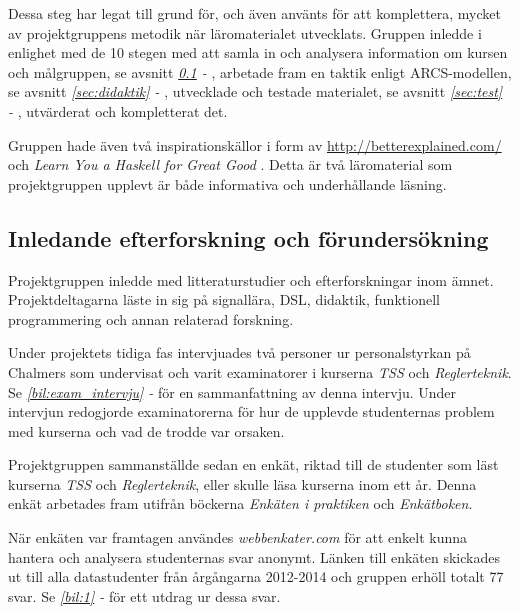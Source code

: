\documentclass[12pt,a4paper,twoside,openright]{article}
\begin{document}
Dessa steg har legat till grund för, och även använts för att
komplettera, mycket av projektgruppens metodik när läromaterialet
utvecklats. Gruppen inledde i enlighet med de 10 stegen med att samla
in och analysera information om kursen och målgruppen, se avsnitt
\textit{\ref{sec:efterforskning} - },
arbetade fram en taktik enligt ARCS-modellen, se avsnitt \textit{\ref{sec:didaktik}
- }, utvecklade och testade materialet, se avsnitt \textit{\ref{sec:test}
- }, utvärderat och kompletterat det.

Gruppen hade även två inspirationskällor i form av
\url{http://betterexplained.com/} och \textit{Learn You a Haskell for Great Good} \cite{learnyouahaskell}.
Detta är två läromaterial som projektgruppen upplevt är både
informativa och underhållande läsning.

\subsection{Inledande efterforskning och förundersökning}
\label{sec:efterforskning}

Projektgruppen inledde med litteraturstudier och efterforskningar inom
ämnet. Projektdeltagarna läste in sig på signallära, DSL, didaktik,
funktionell programmering och annan relaterad forskning.

Under projektets tidiga fas intervjuades två personer ur
personalstyrkan på Chalmers som undervisat och varit examinatorer i
kurserna \textit{TSS} och \textit{Reglerteknik}.
Se \textit{\ref{bil:exam_intervju} - } för en sammanfattning av denna
intervju. Under intervjun redogjorde examinatorerna för hur de
upplevde studenternas problem med kurserna och vad de trodde var
orsaken.

Projektgruppen sammanställde sedan en enkät, riktad till de studenter
som läst kurserna \textit{TSS} och \textit{Reglerteknik}, eller skulle
läsa kurserna inom ett år. Denna enkät arbetades fram utifrån böckerna
\textit{Enkäten i praktiken}\cite{enkaten_i_praktiken} och \textit{Enkätboken}\cite{enkatboken}.

När enkäten var framtagen användes \textit{webbenkater.com} för att
enkelt kunna hantera och analysera studenternas svar anonymt.
Länken till enkäten skickades ut till alla
datastudenter från årgångarna 2012-2014 och gruppen erhöll totalt 77
svar. Se \textit{\ref{bil:1} - } för ett utdrag ur dessa svar.
\end{document}
